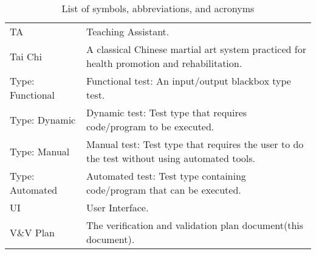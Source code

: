 \documentclass[12pt, titlepage]{article}
\begin{document}
\begin{table}[H]
\begin{tabular}{L{0.25\linewidth}L{0.8\linewidth}}
    TA               & Teaching Assistant.                                                                                                                                                                \\
    Tai Chi          & A classical Chinese martial art system practiced for health promotion and rehabilitation.                                                                                          \\
    Type: Functional & Functional test: An input/output blackbox type test.                                                                                                                               \\
    Type: Dynamic    & Dynamic test: Test type that requires code/program to be executed.                                                                                                                 \\
    Type: Manual     & Manual test: Test type that requires the user to do the test without using automated tools.                                                                                        \\
    Type: Automated  & Automated test: Test type containing code/program that can be executed.                                                                                                            \\
    UI               & User Interface.                                                                                                                                                                    \\
    V\&V Plan        & The verification and validation plan document(this document).                                                                                                                      \\ \bottomrule
  \end{tabular}
  \caption{List of symbols, abbreviations, and acronyms}
  \label{tab:abbrv}
\end{table}
\end{document}

